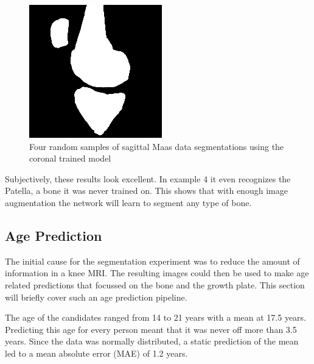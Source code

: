 \begin{figure}[H]
\endminipage\hfill
{}%
  \includegraphics[width=\linewidth]{imgs/transfer_pers_y4.png}
\endminipage
\caption{Four random samples of sagittal Maas data segmentations using the coronal trained model}
\end{figure}

Subjectively, these results look excellent. In example 4 it even recognizes the Patella, a bone it was never trained on. This shows that with enough image augmentation the network will learn to segment any type of bone.

\subsection{Age Prediction}

The initial cause for the segmentation experiment was to reduce the amount of information in a knee MRI. The resulting images could then be used to make age related predictions that focussed on the bone and the growth plate. This section will briefly cover such an age prediction pipeline.

The age of the candidates ranged from 14 to 21 years with a mean at 17.5 years. Predicting this age for every person meant that it was never off more than 3.5 years. Since the data was normally distributed, a static prediction of the mean led to a mean absolute error (MAE) of 1.2 years.

